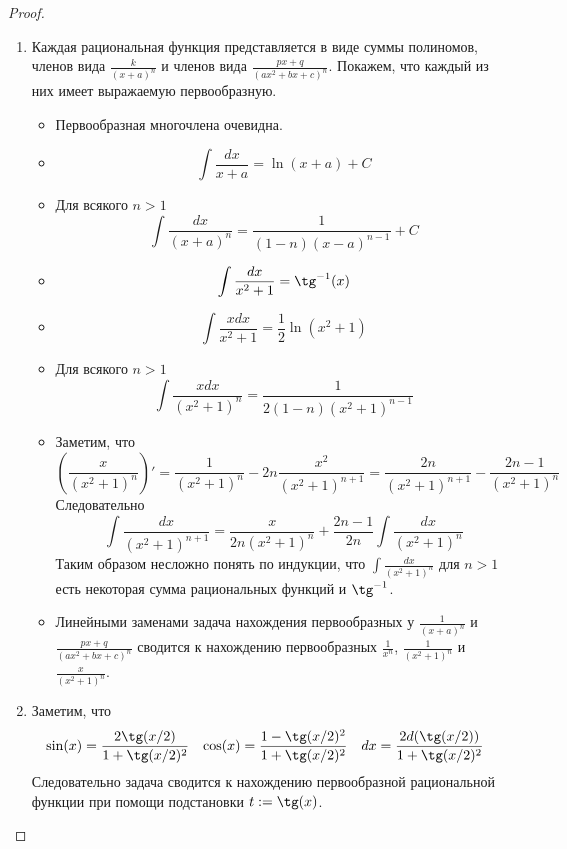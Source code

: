 \documentclass[12pt,a4paper]{article}
\begin{document}
    \begin{proof}
        \begin{enumerate}
            \item Каждая рациональная функция представляется в виде суммы полиномов, членов вида $\frac{k}{(x+a)^n}$ и членов вида $\frac{px+q}{(ax^2+bx+c)^n}$. Покажем, что каждый из них имеет выражаемую первообразную.
                \begin{itemize}
                    \item Первообразная многочлена очевидна.
                    \item \[\int \frac{dx}{x+a} = \ln(x+a) + C\]
                    \item Для всякого $n > 1$
                        \[\int \frac{dx}{(x+a)^n} = \frac{1}{(1-n)(x-a)^{n-1}} + C\]
                    \item \[\int \frac{dx}{x^2+1} = \tg^{-1}(x)\]
                    \item \[\int \frac{xdx}{x^2+1} = \frac{1}{2} \ln(x^2+1)\]
                    \item Для всякого $n > 1$
                        \[\int \frac{xdx}{(x^2 + 1)^n} = \frac{1}{2(1-n)(x^2+1)^{n-1}}\]
                    \item Заметим, что
                        \[
                            \left(\frac{x}{(x^2+1)^n}\right)'
                            = \frac{1}{(x^2+1)^n} - 2n \frac{x^2}{(x^2+1)^{n+1}}
                            = \frac{2n}{(x^2+1)^{n+1}} - \frac{2n-1}{(x^2+1)^n}
                        \]
                        Следовательно
                        \[\int \frac{dx}{(x^2+1)^{n+1}} = \frac{x}{2n(x^2+1)^n} + \frac{2n-1}{2n} \int \frac{dx}{(x^2+1)^n}\]
                        Таким образом несложно понять по индукции, что $\int \frac{dx}{(x^2+1)^n}$ для $n > 1$ есть некоторая сумма рациональных функций и $\tg^{-1}$.
                    \item Линейными заменами задача нахождения первообразных у $\frac{1}{(x+a)^n}$ и $\frac{px+q}{(ax^2+bx+c)^n}$ сводится к нахождению первообразных $\frac{1}{x^n}$, $\frac{1}{(x^2+1)^n}$ и $\frac{x}{(x^2+1)^n}$.
                \end{itemize}

            \item Заметим, что
                \begin{align*}
                    \sin(x) &= \frac{2 \tg(x/2)}{1 + \tg(x/2)^2}&
                    \cos(x) &= \frac{1 - \tg(x/2)^2}{1 + \tg(x/2)^2}&
                    dx &= \frac{2d(\tg(x/2))}{1+\tg(x/2)^2}
                \end{align*}
                Следовательно задача сводится к нахождению первообразной рациональной функции при помощи подстановки $t := \tg(x)$.


\end{enumerate}
\end{proof}
\end{document}
